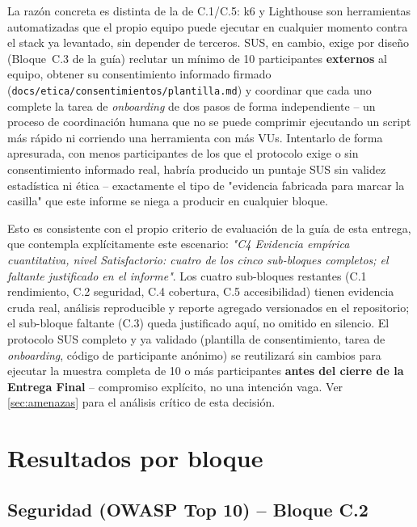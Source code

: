 \documentclass[12pt,a4paper]{article}
\begin{document}
La razón concreta es distinta de la de C.1/C.5: k6 y Lighthouse son
herramientas automatizadas que el propio equipo puede ejecutar en
cualquier momento contra el stack ya levantado, sin depender de terceros.
SUS, en cambio, exige por diseño (Bloque~C.3 de la guía) reclutar un
mínimo de 10 participantes \textbf{externos} al equipo, obtener su
consentimiento informado firmado (\texttt{docs/etica/consentimientos/plantilla.md})
y coordinar que cada uno complete la tarea de \emph{onboarding} de dos
pasos de forma independiente -- un proceso de coordinación humana que no
se puede comprimir ejecutando un script más rápido ni corriendo una
herramienta con más VUs. Intentarlo de forma apresurada, con menos
participantes de los que el protocolo exige o sin consentimiento
informado real, habría producido un puntaje SUS sin validez estadística
ni ética -- exactamente el tipo de "evidencia fabricada para marcar la
casilla" que este informe se niega a producir en cualquier bloque.

Esto es consistente con el propio criterio de evaluación de la guía de
esta entrega, que contempla explícitamente este escenario: \emph{"C4
Evidencia empírica cuantitativa, nivel Satisfactorio: cuatro de los cinco
sub-bloques completos; el faltante justificado en el informe"}. Los
cuatro sub-bloques restantes (C.1 rendimiento, C.2 seguridad, C.4
cobertura, C.5 accesibilidad) tienen evidencia cruda real, análisis
reproducible y reporte agregado versionados en el repositorio; el
sub-bloque faltante (C.3) queda justificado aquí, no omitido en
silencio. El protocolo SUS completo y ya validado (plantilla de
consentimiento, tarea de \emph{onboarding}, código de participante
anónimo) se reutilizará sin cambios para ejecutar la muestra completa de
10 o más participantes \textbf{antes del cierre de la Entrega Final} --
compromiso explícito, no una intención vaga. Ver \autoref{sec:amenazas}
para el análisis crítico de esta decisión.

\section{Resultados por bloque}
\label{sec:resultados}

\subsection{Seguridad (OWASP Top 10) -- Bloque C.2}
\end{document}
